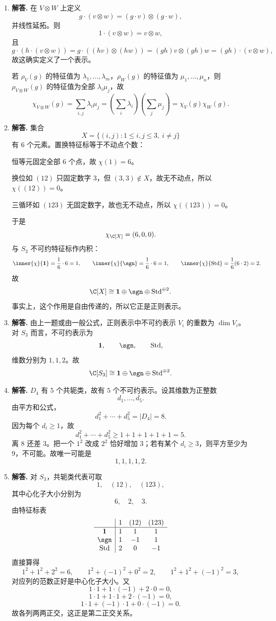 \begin{enumerate}[label=\textbf{\arabic*.}, leftmargin=*, itemsep=1em]
\item \textbf{解答.} 在 $V\otimes W$ 上定义
\[
g\cdot(v\otimes w)=(g\cdot v)\otimes(g\cdot w),
\]
并线性延拓。则
\[
1\cdot(v\otimes w)=v\otimes w,
\]
且
\[
g\cdot(h\cdot(v\otimes w))
=g\cdot((hv)\otimes(hw))
=(gh)v\otimes(gh)w
=(gh)\cdot(v\otimes w),
\]
故这确实定义了一个表示。

若 $\rho_V(g)$ 的特征值为 $\lambda_1,\dots,\lambda_m$，$\rho_W(g)$ 的特征值为 $\mu_1,\dots,\mu_n$，则 $\rho_{V\otimes W}(g)$ 的特征值为全部 $\lambda_i\mu_j$，故
\[
\chi_{V\otimes W}(g)=\sum_{i,j}\lambda_i\mu_j
=\left(\sum_i\lambda_i\right)\left(\sum_j\mu_j\right)
=\chi_V(g)\chi_W(g).
\]

\item \textbf{解答.} 集合
\[
X=\{(i,j):1\le i,j\le3,\ i\neq j\}
\]
有 $6$ 个元素。置换特征标等于不动点个数：

恒等元固定全部 $6$ 个点，故 $\chi(1)=6$。

换位如 $(12)$ 只固定数字 $3$，但 $(3,3)\notin X$，故无不动点，所以 $\chi((12))=0$。

三循环如 $(123)$ 无固定数字，故也无不动点，所以 $\chi((123))=0$。

于是
\[
\chi_{\C[X]}=(6,0,0).
\]
与 $S_3$ 不可约特征标作内积：
\[
\inner{\chi}{\mathbf1}=\frac16\cdot6=1,\qquad
\inner{\chi}{\sgn}=\frac16\cdot6=1,\qquad
\inner{\chi}{\mathrm{Std}}=\frac16(6\cdot2)=2.
\]
故
\[
\C[X]\cong \mathbf1\oplus \sgn\oplus \mathrm{Std}^{\oplus2}.
\]
事实上，这个作用是自由传递的，所以它正是正则表示。

\item \textbf{解答.} 由上一题或由一般公式，正则表示中不可约表示 $V_i$ 的重数为 $\dim V_i$。对 $S_3$ 而言，不可约表示为
\[
\mathbf1,\qquad \sgn,\qquad \mathrm{Std},
\]
维数分别为 $1,1,2$。故
\[
\C[S_3]\cong \mathbf1\oplus \sgn\oplus \mathrm{Std}^{\oplus2}.
\]

\item \textbf{解答.} $D_4$ 有 $5$ 个共轭类，故有 $5$ 个不可约表示。设其维数为正整数
\[
d_1,\dots,d_5.
\]
由平方和公式，
\[
d_1^2+\cdots+d_5^2=|D_4|=8.
\]
因为每个 $d_i\ge1$，故
\[
d_1^2+\cdots+d_5^2\ge 1+1+1+1+1=5.
\]
离 $8$ 还差 $3$。把一个 $1^2$ 改成 $2^2$ 恰好增加 $3$；若有某个 $d_i\ge3$，则平方至少为 $9$，不可能。故唯一可能是
\[
1,1,1,1,2.
\]

\item \textbf{解答.} 对 $S_3$，共轭类代表可取
\[
1,\quad (12),\quad (123),
\]
其中心化子大小分别为
\[
6,\quad 2,\quad 3.
\]
由特征标表
\[
\begin{array}{c|ccc}
 & 1 & (12) & (123)\\
\hline
\mathbf{1} & 1 & 1 & 1\\
\sgn & 1 & -1 & 1\\
\mathrm{Std} & 2 & 0 & -1
\end{array}
\]
直接算得
\[
1^2+1^2+2^2=6,\qquad
1^2+(-1)^2+0^2=2,\qquad
1^2+1^2+(-1)^2=3,
\]
对应列的范数正好是中心化子大小。又
\[
1\cdot1+1\cdot(-1)+2\cdot0=0,
\]
\[
1\cdot1+1\cdot1+2\cdot(-1)=0,
\]
\[
1\cdot1+(-1)\cdot1+0\cdot(-1)=0.
\]
故各列两两正交，这正是第二正交关系。


\end{enumerate}
